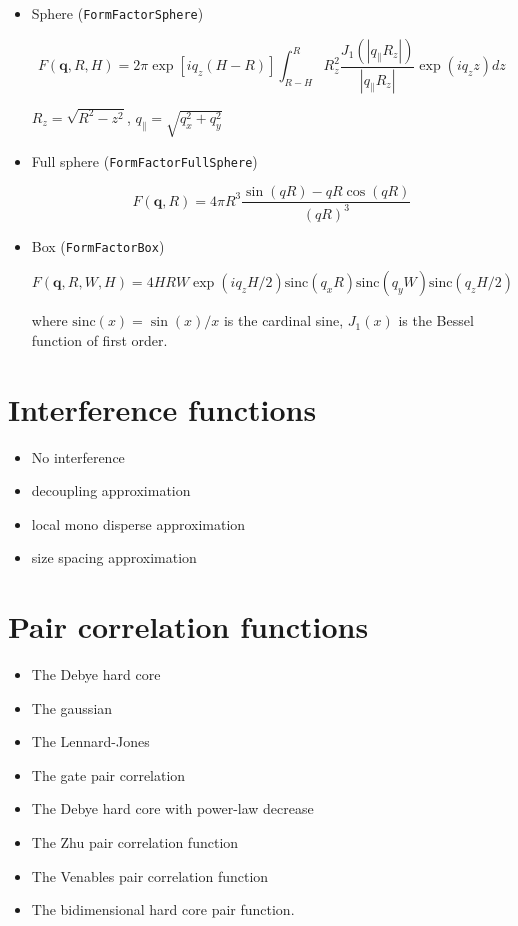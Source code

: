 \begin{itemize}
\item Sphere (\texttt{FormFactorSphere})

\begin{equation}    
F(\mathbf{q},R, H)= 2\pi \exp[i q_z (H-R)]\int_{R-H} ^{R} R_z^2 \frac{J_1(|q_{\parallel}
  R_z|) }{|q_{\parallel} R_z|}
        \exp(i q_z z) dz
\end{equation}

$R_z=\sqrt{R^2-z^2}$, $q_{\parallel}=\sqrt{q_x^2+q_y^2}$

\item Full sphere (\texttt{FormFactorFullSphere})

\begin{equation}
F(\mathbf{q},R) = 4\pi R^3 \frac{\sin(q R) - q R \cos(q R)}{(qR)^3}
\end{equation}
\item Box (\texttt{FormFactorBox})

\begin{equation}
F(\mathbf{q},R,W,H)= 4H R W\exp(i q_z H/2) \text{sinc}(q_x R) \text{sinc}(q_y W) \text{sinc}(q_z H/2)
\end{equation}
    
where $\text{sinc}(x)=\sin(x)/x$ is the cardinal sine, $J_1(x)$ is the
Bessel function of first order.
	
\end{itemize}

\chapter{Interference functions}

\begin{itemize}
\item	No interference 
\item	decoupling approximation 	
\item 	local mono disperse approximation 
\item 	size spacing approximation 
\end{itemize}


\chapter{Pair correlation functions}
\begin{itemize}
\item The Debye hard core 
\item The gaussian
\item The Lennard-Jones  	
\item The gate pair correlation 	
\item The Debye hard core with power-law decrease  	
\item The Zhu pair correlation function 	
\item The Venables pair correlation function 	
\item The bidimensional hard core pair function.
\end{itemize}	
